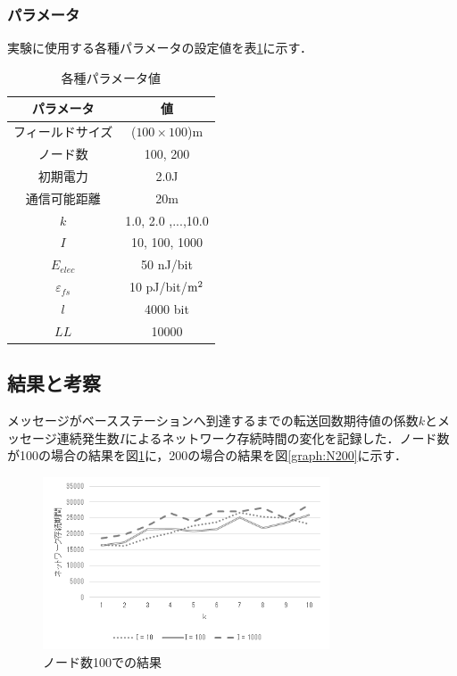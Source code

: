 \documentclass[a4j,10pt]{jarticle}
\begin{document}
\subsubsection{パラメータ}
実験に使用する各種パラメータの設定値を表\ref{tab:parameter}に示す．

\vspace{5mm}
\begin{table}[htb]
  \begin{center}
    \begin{tabular}{cc} \hline
      パラメータ & 値 \\  \hline
      フィールドサイズ & ($100\times100$)m \\
      ノード数 & 100, 200 \\
      初期電力 & 2.0J \\
      $通信可能距離$ & 20m \\
      $k$ & 1.0, 2.0 ,...,10.0 \\
      $I$ & 10, 100, 1000 \\
      $E_{elec}$ & 50 nJ/bit \\
      $\varepsilon_{fs}$ & 10 pJ/bit/${\rm m^2}$ \\
      $l$ & 4000 bit \\
      $LL$ & 10000 \\ \hline
    \end{tabular}
    \caption{各種パラメータ値}
    \label{tab:parameter}
  \end{center}
\end{table}
\vspace{-7mm}

\newpage
\subsection{結果と考察}
メッセージがベースステーションへ到達するまでの転送回数期待値の係数$k$とメッセージ連続発生数$I$によるネットワーク存続時間の変化を記録した．ノード数が100の場合の結果を図\ref{graph:N100}に，200の場合の結果を図\ref{graph:N200}に示す．

\begin{figure}[h]
  \begin{center}
  \includegraphics[width=8.5cm,clip]{./N100.png}
  \vspace{-8mm}
  \caption{ノード数100での結果}
  \label{graph:N100}
  \end{center}
\end{figure}
\end{document}
